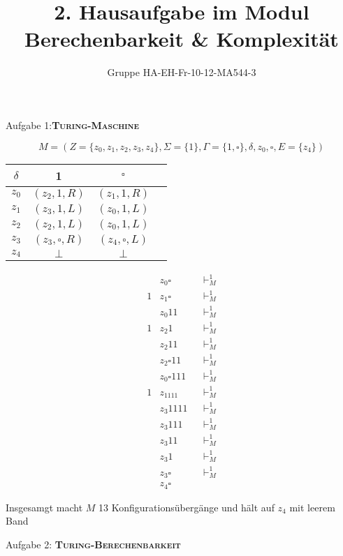 \documentclass[a4paper,onecolumn,oneside,12pt,ngerman]{article}
\date{}
\title{2. Hausaufgabe im Modul \\ \glqq Berechenbarkeit \& Komplexität\grqq} %
\author{Gruppe HA-EH-Fr-10-12-MA544-3} %
\theoremstyle{plain} %
\theoremstyle{definition} %
\theoremstyle{remark} %
\theoremstyle{plain}
\newcommand{\tstep}[1][1]{\vdash^#1_M} %
\begin{document}

\maketitle
\newpage
Aufgabe 1:\quad \textsc{\textbf{Turing-Maschine}}

\[ M = (Z = \{z_0, z_1, z_2, z_3, z_4\}, \Sigma = \{1\}, \Gamma = \{1,\square\},\delta, z_0, \square, E = \{z_4\}) \]

\begin{center}
	\begin{tabular}{c|ccc}
	$\delta$ & 1           & $\square$ \\ \hline
	$z_0$    & $(z_2,1,R)$ & $(z_1,1,R)$\\
	$z_1$    & $(z_3,1,L)$ & $(z_0,1,L)$\\
	$z_2$    & $(z_2,1,L)$ & $(z_0,1,L)$\\
	$z_3$    & $(z_3,\square, R)$ & $(z_4,\square,L)$\\
	$z_4$    & $\bot$ & $\bot$\\
	\end{tabular}
\end{center}

\begin{align*}
  &z_0 \square  &&\tstep  \\
  1&z_1 \square  &&\tstep  \\
  &z_0 11    &&\tstep  \\
  1&z_2 1     &&\tstep  \\
  &z_2 11    &&\tstep  \\
  &z_2 \square11   &&\tstep  \\
  &z_0 \square111  &&\tstep  \\
  1&z_1111  &&\tstep \\
  &z_3 1111  &&\tstep \\
  &z_3 111  &&\tstep \\
  &z_3 11  &&\tstep \\
  &z_3 1  &&\tstep \\
  &z_3 \square  &&\tstep \\
  &z_4 \square  
\end{align*}

Insgesamgt macht $M$ 13 Konfigurationsübergänge und hält auf $z_4$ mit leerem Band

\newpage
Aufgabe 2: \quad \textsc{\textbf{Turing-Berechenbarkeit}}
\end{document}
